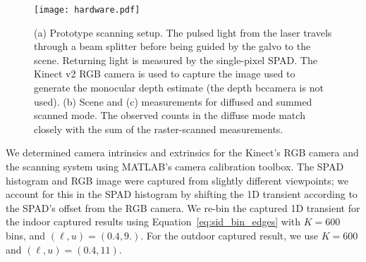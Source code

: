 \begin{figure}[t]
	\centering
  \texttt{[image: hardware.pdf]}
  \caption{(a) Prototype scanning setup. The pulsed light from the laser travels
    through a beam splitter before being guided by the galvo to the scene.
    Returning light is measured by the single-pixel SPAD. The Kinect v2 RGB 
    camera is used to capture the image used to generate the monocular depth estimate
    (the depth bccamera is not used). (b) Scene and (c) measurements for diffused and summed scanned mode. The observed
    counts in the diffuse mode match closely with the sum of the raster-scanned
    measurements.}
  \label{fig:hardware}
\end{figure}

We determined camera intrinsics and extrinsics for the Kinect's RGB camera and
the scanning system using MATLAB's camera calibration toolbox. 
The SPAD histogram and RGB image were captured from slightly different
viewpoints; we account for this in the SPAD histogram by shifting the 1D
transient according to the SPAD's offset from the RGB camera. We re-bin the
captured 1D transient for the indoor captured results
using Equation~\ref{eq:sid_bin_edges} with $K = 600$ bins, and $(\ell, u)=(0.4, 9.)$.
For the outdoor captured result, we use $K=600$ and $(\ell, u)=(0.4, 11)$.

%

